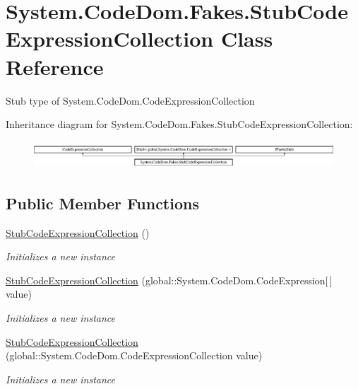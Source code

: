\hypertarget{class_system_1_1_code_dom_1_1_fakes_1_1_stub_code_expression_collection}{\section{System.\-Code\-Dom.\-Fakes.\-Stub\-Code\-Expression\-Collection Class Reference}
\label{class_system_1_1_code_dom_1_1_fakes_1_1_stub_code_expression_collection}
}


Stub type of System.\-Code\-Dom.\-Code\-Expression\-Collection 


Inheritance diagram for System.\-Code\-Dom.\-Fakes.\-Stub\-Code\-Expression\-Collection\-:\begin{figure}[H]
\begin{center}
\leavevmode
\includegraphics[height=1.034164cm]{class_system_1_1_code_dom_1_1_fakes_1_1_stub_code_expression_collection}
\end{center}
\end{figure}
\subsection*{Public Member Functions}
\begin{DoxyCompactItemize}
\item 
\hyperlink{class_system_1_1_code_dom_1_1_fakes_1_1_stub_code_expression_collection_aaa7df2d8104c76af97f87538da32f71d}{Stub\-Code\-Expression\-Collection} ()
\begin{DoxyCompactList}\small\item\em Initializes a new instance\end{DoxyCompactList}\item 
\hyperlink{class_system_1_1_code_dom_1_1_fakes_1_1_stub_code_expression_collection_a23aec6072329013f07abbbb5d951a6c4}{Stub\-Code\-Expression\-Collection} (global\-::\-System.\-Code\-Dom.\-Code\-Expression\mbox{[}$\,$\mbox{]} value)
\begin{DoxyCompactList}\small\item\em Initializes a new instance\end{DoxyCompactList}\item 
\hyperlink{class_system_1_1_code_dom_1_1_fakes_1_1_stub_code_expression_collection_a67eb0c558ecb51220ffbb46f4d468dfe}{Stub\-Code\-Expression\-Collection} (global\-::\-System.\-Code\-Dom.\-Code\-Expression\-Collection value)
\begin{DoxyCompactList}\small\item\em Initializes a new instance\end{DoxyCompactList}\end{DoxyCompactItemize}
